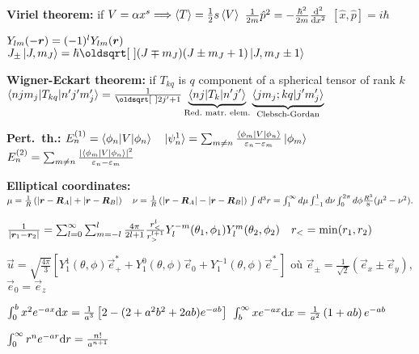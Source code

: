 \begin{squishlist}
    \item \textbf{Viriel theorem:} if $V = \alpha x^s \Longrightarrow \braket{T} = \frac{1}{2}s \braket{V}$
    \squishsep $\frac{1}{2m}\hat{p}^2 = - \frac{\hbar^2}{2m} \dder{x}{}$
    \qquad $[\hat{x}, \hat{p}] = i \hbar$
    \item $Y_{lm}(-\vr) = (-1)^l Y_{lm}(\vr)$ \squishsep $J_{\pm} \ket{J,m_J} = \hbar \sqrt{(J \mp m_J)(J \pm m_J + 1)} \ket{J,m_J \pm 1 }$
    \item \textbf{Wigner-Eckart theorem:} if $T_{kq}$ is $q$ component of a spherical tensor of rank $k$ \\
    $\braket{n j m_j | T_{kq} | n' j' m_j'} = \frac{1}{\sqrt{2j'+1}} \underbrace{\braket{n j | T_k | n'j'}}_{\text{Red.\ matr.\ elem.}} \underbrace{\braket{j m_j ; k q | j' m_j'}}_{\text{Clebsch-Gordan}}$
    \item \textbf{Pert.\ th.:} $E_n^{(1)}=\braket{\phi_n|V|\phi_n} \quad \ket{\psi^1_n} = \sum_{m\neq n}\frac{\braket{\phi_m|V|\phi_n}}{\varepsilon_n - \varepsilon_m} \ket{\phi_m}$ \quad
    $E_n^{(2)} = \sum_{m\neq n}\frac{|\braket{\phi_m|V|\phi_n}|^2}{\varepsilon_n - \varepsilon_m}$
    \item \textbf{Elliptical coordinates:} $\mu = \frac{1}{R} \left(|\vec{r}-\vec{R}_A| + | \vec{r} - \vec{R}_B| \right) \quad 
    \nu = \frac{1}{R} \left(|\vec{r}-\vec{R}_A| - | \vec{r} - \vec{R}_B| \right) \\
    \int d^3r = \int_1^\infty d\mu \int_{-1}^1 d \nu \int_0^{2\pi} d \phi \frac{R^3}{8} ( \mu^2 - \nu^2).$
    \item $\frac{1}{|\vr_1 - \vr_2|} = \sum_{l=0}^{\infty} \sum_{m=-l}^{l} \frac{4\pi}{2l+1} \frac{r_<^l}{r_>^{l+1}} Y_l^{-m}(\theta_1, \phi_1) Y_l^{m}(\theta_2, \phi_2) \quad r_< = \min(r_1,r_2)$
    \item $\vec{u} = \sqrt{\frac{4\pi}{3}}\left[Y_1^1(\theta,\phi) \vec{e}_+^* + Y_1^0(\theta,\phi)\vec{e}_0 + Y_1^{-1}(\theta,\phi)\vec{e}_-^*\right]$ où $\vec{e}_{\pm} = \frac{1}{\sqrt{2}}(\vec{e}_x \pm \vec{e}_y)$, $\vec{e}_0 = \vec{e}_z$
\end{squishlist}

\begin{squishlist}
    \item $\int_{0}^{b} x^2 e^{-ax} \ud x = \frac{1}{a^3}\left[2 - (2 + a^2 b^2 + 2ab)e^{-ab}\right]$ 
    \squishsep $\int_{b}^{\infty} x e^{-ax} \ud x = \frac{1}{a^2} \left(1 + ab\right)e^{-ab}$
    \item $\int_{0}^{\infty} r^n e^{-ar} \ud r = \frac{n!}{a^{n+1}}$
\end{squishlist}